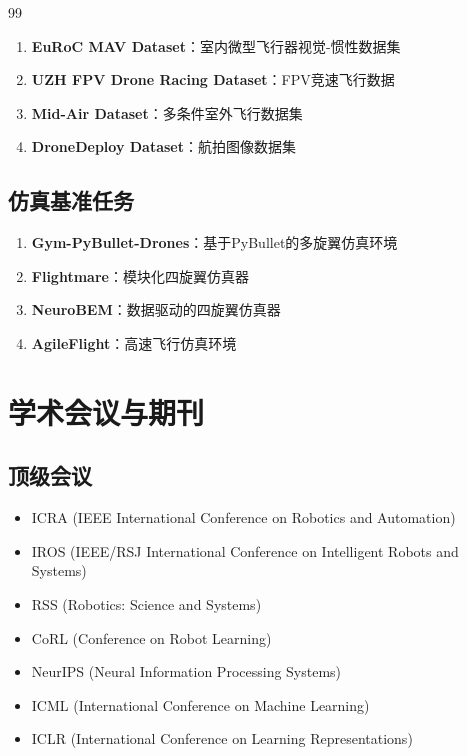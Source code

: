 \documentclass[12pt,a4paper]{ctexart}
\begin{document}
\begin{thebibliography}{99}
\begin{enumerate}
    \item \textbf{EuRoC MAV Dataset}：室内微型飞行器视觉-惯性数据集
    \item \textbf{UZH FPV Drone Racing Dataset}：FPV竞速飞行数据
    \item \textbf{Mid-Air Dataset}：多条件室外飞行数据集
    \item \textbf{DroneDeploy Dataset}：航拍图像数据集
\end{enumerate}

\subsection{仿真基准任务}

\begin{enumerate}
    \item \textbf{Gym-PyBullet-Drones}：基于PyBullet的多旋翼仿真环境
    \item \textbf{Flightmare}：模块化四旋翼仿真器
    \item \textbf{NeuroBEM}：数据驱动的四旋翼仿真器
    \item \textbf{AgileFlight}：高速飞行仿真环境
\end{enumerate}

\section{学术会议与期刊}\label{app:venues}

\subsection{顶级会议}

\begin{itemize}
    \item ICRA (IEEE International Conference on Robotics and Automation)
    \item IROS (IEEE/RSJ International Conference on Intelligent Robots and Systems)
    \item RSS (Robotics: Science and Systems)
    \item CoRL (Conference on Robot Learning)
    \item NeurIPS (Neural Information Processing Systems)
    \item ICML (International Conference on Machine Learning)
    \item ICLR (International Conference on Learning Representations)
\end{itemize}


\end{thebibliography}
\end{document}
